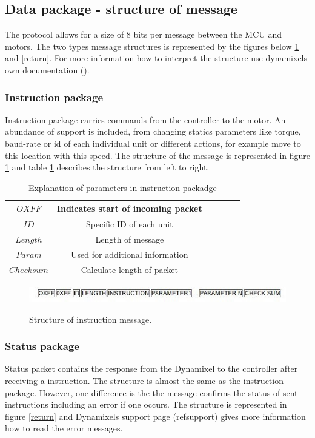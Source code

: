 \subsection{Data package - structure of message}
The protocol allows for a size of 8 bits per message between the MCU and motors. 
The two types message structures is represented by the figures below \ref{instr} and \ref{return}.
For more information how to interpret the structure use dynamixels own documentation ().

\subsubsection{Instruction package}
Instruction package carries commands from the controller to the motor.
An abundance of support is included,
from changing statics parameters like torque, baud-rate or id of each individual unit or different actions,
for example move to this location with this speed.
The structure of the message is represented in figure \ref{instr} and table \ref{instr_table} describes the structure from left to right. 

\begin{table}[H]
    \centering
    \caption{Explanation of parameters in instruction packadge}
    \begin{tabular}{c | c c c c c}
        \(OXFF\) & Indicates start of incoming packet  \\
        \hline
        \(ID\) & Specific ID of each unit  \\
        \hline
        \(Length\) & Length of message \\
        \hline
        \(Param\) & Used for additional information  \\
        \hline
        \(Check sum\) & Calculate length of packet \\
        \hline
    \end{tabular}
    \label{instr_table}
\end{table}

\begin{figure}[H]
    \graphicspath{ {img/} }
    \centering
    
    \includegraphics[width = 9 cm]{img/instruction_packadge}
    \label{instr}
    \caption{Structure of instruction message.}
\end{figure}

\subsubsection{Status package}
Status packet contains the response from the Dynamixel to the controller after receiving a instruction.
The structure is almost the same as the instruction package.
However, one difference is the the message confirms the status of sent instructions including an error if one occurs.
The structure is represented in figure \ref{return} and Dynamixels support page (refsupport) gives more information how to read the error messages.

